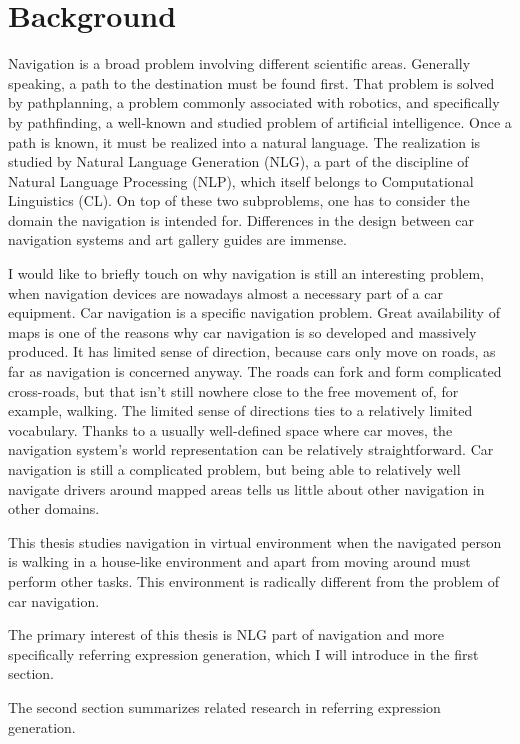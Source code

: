 \chapter{Background}
\label{chap:bg}
Navigation is a broad problem involving different scientific areas. Generally speaking, a path to the destination must be found first. That problem is solved by pathplanning, a problem commonly associated with robotics, and specifically by pathfinding, a well-known and studied problem of artificial intelligence. Once a path is known, it must be realized into a natural language. The realization is studied by Natural Language Generation (NLG), a part of the discipline of Natural Language Processing (NLP), which itself belongs to Computational Linguistics (CL). On top of these two subproblems, one has to consider the domain the navigation is intended for. Differences in the design between car navigation systems and art gallery guides are immense.

I would like to briefly touch on why navigation is still an interesting problem, when navigation devices are nowadays almost a necessary part of a car equipment. Car navigation is a specific navigation problem. Great availability of maps is one of the reasons why car navigation is so developed and massively produced. It has limited sense of direction, because cars only move on roads, as far as navigation is concerned anyway. The roads can fork and form complicated cross-roads, but that isn't still nowhere close to the free movement of, for example, walking. The limited sense of directions ties to a relatively limited vocabulary. Thanks to a usually well-defined space where car moves, the navigation system's world representation can be relatively straightforward. Car navigation is still a complicated problem, but being able to relatively well navigate drivers around mapped areas tells us little about other navigation in other domains.

This thesis studies navigation in virtual environment when the navigated person is walking in a house-like environment and apart from moving around must perform other tasks. This environment is radically different from the problem of car navigation. 

The primary interest of this thesis is NLG part of navigation and more specifically referring expression generation, which I will introduce in the first section. 

The second section summarizes related research in referring expression generation. 


